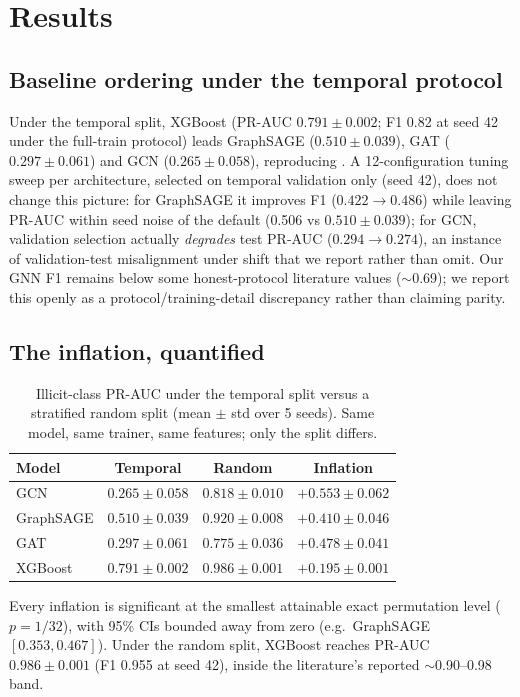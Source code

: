 \documentclass[10pt]{article}
\begin{document}
\section{Results}
\subsection{Baseline ordering under the temporal protocol}
Under the temporal split, XGBoost (PR-AUC $0.791\pm0.002$; F1 0.82 at seed 42
under the full-train protocol) leads GraphSAGE ($0.510\pm0.039$), GAT
($0.297\pm0.061$) and GCN ($0.265\pm0.058$), reproducing \citet{weber2019aml}. A
12-configuration tuning sweep per architecture, selected on temporal validation
only (seed 42), does not change this picture: for GraphSAGE it improves F1
($0.422 \rightarrow 0.486$) while leaving PR-AUC within seed noise of the default
(0.506 vs $0.510\pm0.039$); for GCN, validation selection actually \emph{degrades}
test PR-AUC ($0.294 \rightarrow 0.274$), an instance of validation-test
misalignment under shift that we report rather than omit. Our GNN F1 remains below
some honest-protocol literature values ($\sim$0.69); we report this openly as a
protocol/training-detail discrepancy rather than claiming parity.

\subsection{The inflation, quantified}
\begin{table}[h]
\centering
\caption{Illicit-class PR-AUC under the temporal split versus a stratified
random split (mean $\pm$ std over 5 seeds). Same model, same trainer, same
features; only the split differs.}
\label{tab:inflation}
\begin{tabular}{lccc}
\toprule
Model & Temporal & Random & Inflation \\
\midrule
GCN & $0.265\pm0.058$ & $0.818\pm0.010$ & $+0.553\pm0.062$ \\
GraphSAGE & $0.510\pm0.039$ & $0.920\pm0.008$ & $+0.410\pm0.046$ \\
GAT & $0.297\pm0.061$ & $0.775\pm0.036$ & $+0.478\pm0.041$ \\
XGBoost & $0.791\pm0.002$ & $0.986\pm0.001$ & $+0.195\pm0.001$ \\
\bottomrule
\end{tabular}
\end{table}

Every inflation is significant at the smallest attainable exact permutation level
($p=1/32$), with 95\% CIs bounded away from zero (e.g.\ GraphSAGE $[0.353,0.467]$).
Under the random split, XGBoost reaches PR-AUC $0.986\pm0.001$ (F1 0.955 at seed
42), inside the literature's reported $\sim$0.90--0.98 band.
\end{document}
